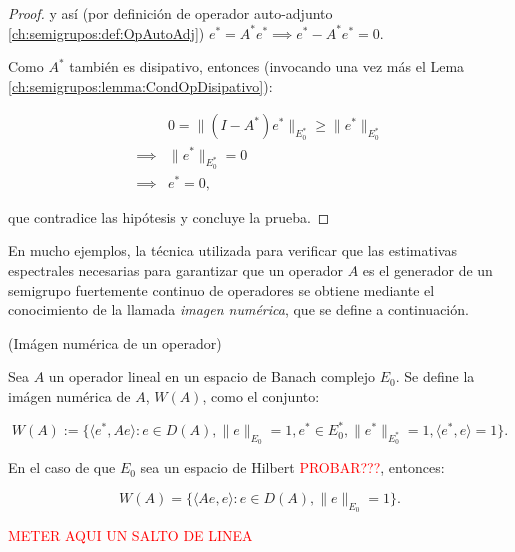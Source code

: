 \begin{proof}
    y así (por definición de operador auto-adjunto \ref{ch:semigrupos:def:OpAutoAdj}) $e^* = A^* e^* \implies e^* - A^*e^* = 0$.

    Como $A^*$ también es disipativo, entonces (invocando una vez más el Lema \ref{ch:semigrupos:lemma:CondOpDisipativo}):

    \begin{align*}
    &0 = \lVert (I - A^*)e^* \rVert_{E^*_0} \geq \lVert e^* \rVert_{E_0^*}\\
    \implies& \lVert e^* \rVert_{E_0^*} = 0\\
    \implies& e^* = 0,
    \end{align*}

    que contradice las hipótesis y concluye la prueba.
\end{proof}

En mucho ejemplos, la técnica utilizada para verificar que las estimativas espectrales necesarias para garantizar que un operador $A$ es el generador de un semigrupo fuertemente continuo de operadores se obtiene mediante el conocimiento de la llamada \textit{imagen numérica}, que se define a continuación.

\begin{Definicion}{(Imágen numérica de un operador)}
    \label{ch:semigrupos:def:imgNumerica}

    Sea $A$ un operador lineal en un espacio de Banach complejo $E_0$. Se define la imágen numérica de $A$, $W(A)$, como el conjunto:

    \[W(A) := \Big \{\langle e^*, Ae \rangle : e \in D(A), \lVert e \rVert_{E_0} = 1, e^* \in E_0^*, \lVert e^* \rVert_{E_0^*} = 1, \langle e^*, e \rangle = 1  \Big \}.\]

    En el caso de que $E_0$ sea un espacio de Hilbert \textcolor{red}{PROBAR???}, entonces:

    \[W(A) = \Big \{\langle Ae, e\rangle : e \in D(A), \lVert e \rVert_{E_0} = 1 \Big \}.\]
\end{Definicion}

\textcolor{red}{METER AQUI UN SALTO DE LINEA}\\

